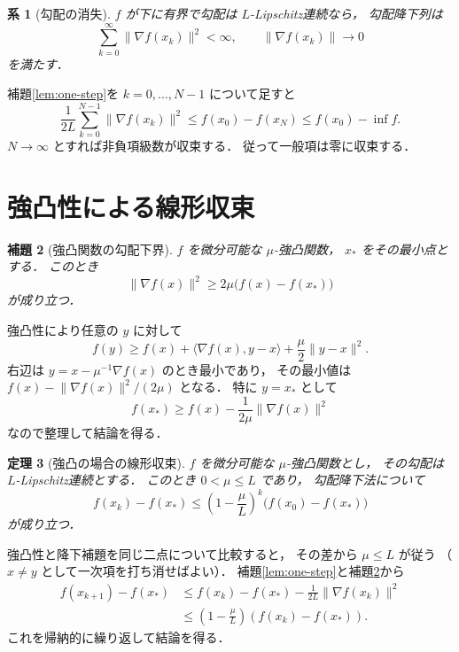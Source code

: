 \documentclass[a5paper,10pt,onecolumn]{jsarticle}
\makeatletter
\theoremstyle{mathnotetheorem}
\newtheorem{theorem}{定理}[section]
\newtheorem{lemma}[theorem]{補題}
\newtheorem{corollary}[theorem]{系}
\renewcommand{\proofname}{証明}
\renewenvironment{proof}[1][\proofname]{%
  \par\pushQED{\qed}\normalfont\topsep4\p@\@plus2\p@\relax
  \trivlist\item[\hskip\labelsep\bfseries #1]\ignorespaces
}{\popQED\endtrivlist\@endpefalse}
\newcommand{\norm}[1]{\lVert #1\rVert}
\makeatother
\begin{document}
\begin{corollary}[勾配の消失]\label{cor:grad-zero}
$f$ が下に有界で勾配は $L$-Lipschitz連続なら，
勾配降下列は
\[
 \sum_{k=0}^\infty\norm{\nabla f(x_k)}^2<\infty,
 \qquad \norm{\nabla f(x_k)}\to0
\]
を満たす．
\end{corollary}
\begin{proof}
補題\ref{lem:one-step}を $k=0,\dots,N-1$ について足すと
\[
 \frac1{2L}\sum_{k=0}^{N-1}\norm{\nabla f(x_k)}^2
 \le f(x_0)-f(x_N)
 \le f(x_0)-\inf f.
\]
$N\to\infty$ とすれば非負項級数が収束する．
従って一般項は零に収束する．
\end{proof}

\section{強凸性による線形収束}

\begin{lemma}[強凸関数の勾配下界]\label{lem:pl}
$f$ を微分可能な $\mu$-強凸関数，
$x_*$ をその最小点とする．
このとき
\[
 \norm{\nabla f(x)}^2
 \ge2\mu\bigl(f(x)-f(x_*)\bigr)
\]
が成り立つ．
\end{lemma}
\begin{proof}
強凸性により任意の $y$ に対して
\[
 f(y)\ge f(x)+\langle\nabla f(x),y-x\rangle
 +\frac\mu2\norm{y-x}^2.
\]
右辺は $y=x-\mu^{-1}\nabla f(x)$ のとき最小であり，
その最小値は
$f(x)-\norm{\nabla f(x)}^2/(2\mu)$ となる．
特に $y=x_*$ として
\[
 f(x_*)\ge f(x)-\frac1{2\mu}\norm{\nabla f(x)}^2
\]
なので整理して結論を得る．
\end{proof}

\begin{theorem}[強凸の場合の線形収束]\label{thm:linear-rate}
$f$ を微分可能な $\mu$-強凸関数とし，
その勾配は $L$-Lipschitz連続とする．
このとき $0<\mu\le L$ であり，
勾配降下法について
\[
 f(x_k)-f(x_*)
 \le\left(1-\frac\mu L\right)^k
 \bigl(f(x_0)-f(x_*)\bigr)
\]
が成り立つ．
\end{theorem}
\begin{proof}
強凸性と降下補題を同じ二点について比較すると，
その差から $\mu\le L$ が従う
（$x\ne y$ として一次項を打ち消せばよい）．
補題\ref{lem:one-step}と補題\ref{lem:pl}から
\begin{align*}
 f(x_{k+1})-f(x_*)
 &\le f(x_k)-f(x_*)-\frac1{2L}\norm{\nabla f(x_k)}^2\\
 &\le\left(1-\frac\mu L\right)
       (f(x_k)-f(x_*)).
\end{align*}
これを帰納的に繰り返して結論を得る．
\end{proof}
\end{document}
